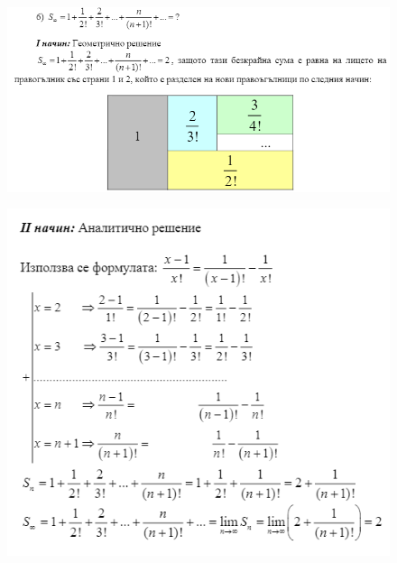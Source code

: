 \documentclass[fleqn, 12pt]{article}
\theoremstyle{definition}
\begin{document}
\begin{figure} [htp!]
\includegraphics{Pics/Discrete math/ex7/ex7-task6-7.png}
\end{figure}
\begin{figure} [htp!]
\includegraphics{Pics/Discrete math/ex7/ex7-task6-8.png}
\end{figure}

\newpage
\end{document}
